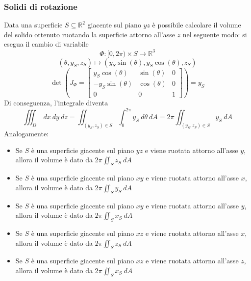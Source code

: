         \subsubsection{Solidi di rotazione}
            Data una superficie $S \subseteq \mathbb{R}^{2}$ giacente sul piano $yz$ è possibile calcolare il volume del solido ottenuto ruotando la superficie attorno all'asse $z$ nel seguente modo:
            si esegua il cambio di variabile
            \[
                \Phi: [0, 2 \pi) \times S \rightarrow \mathbb{R}^{3}
            \]
            \[
                (\theta, y_{S}, z_{S}) \mapsto (y_{S} \sin(\theta), y_{S} \cos(\theta), z_{S})
            \]
            \[
                \det\left( J_{\Phi} = \begin{bmatrix} y_{S} \cos(\theta) & \sin(\theta) & 0 \\ -y_{S} \sin(\theta) & \cos(\theta) & 0 \\ 0 & 0 & 1 \end{bmatrix} \right) = y_{S}
            \]
            Di conseguenza, l'integrale diventa
            \[
                \iiint_{D} \: dx \: dy \: dz = \iint_{(y_{S}, z_{S}) \in S} \int_{0}^{2\pi} y_{S} \: d\theta \: dA = 2\pi \iint_{(y_{S}, z_{S}) \in S} y_{S} \: dA
            \]
            Analogamente:
            \begin{itemize}
                \item Se $S$ è una superficie giacente sul piano $yz$ e viene ruotata attorno all'asse $y$, allora il volume è dato da $\displaystyle 2\pi \iint_{S} z_{S} \: dA$
                \item Se $S$ è una superficie giacente sul piano $xy$ e viene ruotata attorno all'asse $x$, allora il volume è dato da $\displaystyle 2\pi \iint_{S} y_{S} \: dA$
                \item Se $S$ è una superficie giacente sul piano $xy$ e viene ruotata attorno all'asse $y$, allora il volume è dato da $\displaystyle 2\pi \iint_{S} x_{S} \: dA$
                \item Se $S$ è una superficie giacente sul piano $xz$ e viene ruotata attorno all'asse $x$, allora il volume è dato da $\displaystyle 2\pi \iint_{S} z_{S} \: dA$
                \item Se $S$ è una superficie giacente sul piano $xz$ e viene ruotata attorno all'asse $z$, allora il volume è dato da $\displaystyle 2\pi \iint_{S} x_{S} \: dA$
            \end{itemize}
